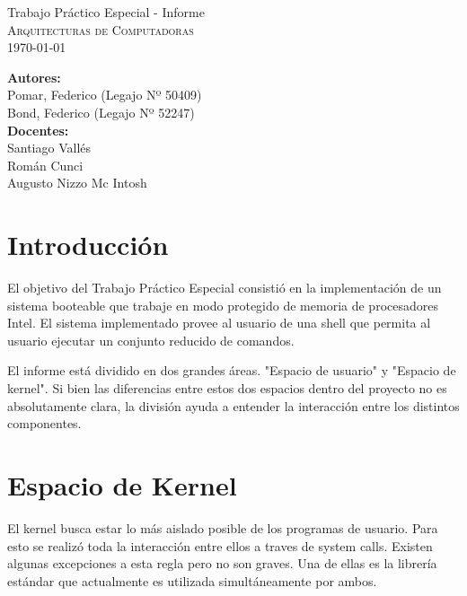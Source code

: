 \documentclass[11pt]{article}
\begin{document}
\begin{titlepage}

\begin{center}
	{ \Huge Trabajo Práctico Especial - Informe}\\[0.4cm]
	\textsc{Arquitecturas de Computadoras}\\[0.5cm]
	{\large \today}\\[1.5cm]
\end{center}

\textbf{Autores:}\\[0.1cm]
Pomar, Federico (Legajo Nº 50409)\\
Bond, Federico (Legajo Nº 52247)\\

\textbf{Docentes:}\\[0.1cm]
Santiago Vallés\\
Román Cunci\\
Augusto Nizzo Mc Intosh\\

\vfill




\end{titlepage}

\pagebreak

\section{Introducción}
El objetivo del Trabajo Práctico Especial consistió en la implementación de un sistema booteable que trabaje en modo protegido de memoria de procesadores Intel. El sistema implementado provee al usuario de una shell que permita al usuario ejecutar un conjunto reducido de comandos.

El informe está dividido en dos grandes áreas. "Espacio de usuario" y "Espacio de kernel". Si bien las diferencias entre estos dos espacios dentro del proyecto no es absolutamente clara, la división ayuda a entender la interacción entre los distintos componentes.

\section{Espacio de Kernel}
El kernel busca estar lo más aislado posible de los programas de usuario. Para esto se realizó toda la interacción entre ellos a traves de system calls. Existen algunas excepciones a esta regla pero no son graves. Una de ellas es la librería estándar que actualmente es utilizada simultáneamente por ambos.
\end{document}

